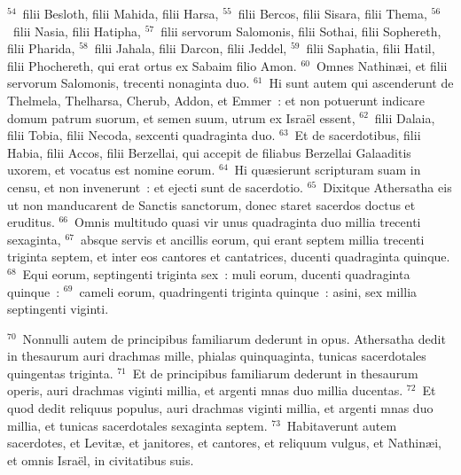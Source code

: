 ${}^{54}$~filii Besloth, filii Mahida, filii Harsa,
${}^{55}$~filii Bercos, filii Sisara, filii Thema,
${}^{56}$~filii Nasia, filii Hatipha,
${}^{57}$~filii servorum Salomonis, filii Sothai, filii Sophereth, filii Pharida,
${}^{58}$~filii Jahala, filii Darcon, filii Jeddel,
${}^{59}$~filii Saphatia, filii Hatil, filii Phochereth, qui erat ortus ex Sabaim filio Amon.
${}^{60}$~Omnes Nathin\ae i, et filii servorum Salomonis, trecenti nonaginta duo.
${}^{61}$~Hi sunt autem qui ascenderunt de Thelmela, Thelharsa, Cherub, Addon, et Emmer~: et non potuerunt indicare domum patrum suorum, et semen suum, utrum ex Isra\"el essent,
${}^{62}$~filii Dalaia, filii Tobia, filii Necoda, sexcenti quadraginta duo.
${}^{63}$~Et de sacerdotibus, filii Habia, filii Accos, filii Berzellai, qui accepit de filiabus Berzellai Galaaditis uxorem, et vocatus est nomine eorum.
${}^{64}$~Hi qu\ae sierunt scripturam suam in censu, et non invenerunt~: et ejecti sunt de sacerdotio.
${}^{65}$~Dixitque Athersatha eis ut non manducarent de Sanctis sanctorum, donec staret sacerdos doctus et eruditus.
${}^{66}$~Omnis multitudo quasi vir unus quadraginta duo millia trecenti sexaginta,
${}^{67}$~absque servis et ancillis eorum, qui erant septem millia trecenti triginta septem, et inter eos cantores et cantatrices, ducenti quadraginta quinque.
${}^{68}$~Equi eorum, septingenti triginta sex~: muli eorum, ducenti quadraginta quinque~:
${}^{69}$~cameli eorum, quadringenti triginta quinque~: asini, sex millia septingenti viginti.


${}^{70}$~Nonnulli autem de principibus familiarum dederunt in opus. Athersatha dedit in thesaurum auri drachmas mille, phialas quinquaginta, tunicas sacerdotales quingentas triginta.
${}^{71}$~Et de principibus familiarum dederunt in thesaurum operis, auri drachmas viginti millia, et argenti mnas duo millia ducentas.
${}^{72}$~Et quod dedit reliquus populus, auri drachmas viginti millia, et argenti mnas duo millia, et tunicas sacerdotales sexaginta septem.
${}^{73}$~Habitaverunt autem sacerdotes, et Levit\ae , et janitores, et cantores, et reliquum vulgus, et Nathin\ae i, et omnis Isra\"el, in civitatibus suis.


